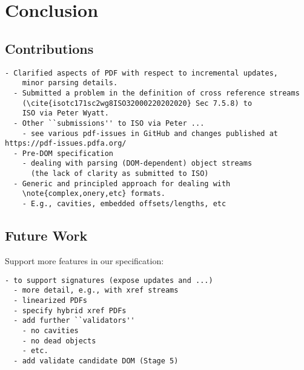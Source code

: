 \section{Conclusion }
\label{sec:conclusion}

\subsection{Contributions}

\begin{lstlisting}[style=meta]
  - Clarified aspects of PDF with respect to incremental updates,
    minor parsing details.
  - Submitted a problem in the definition of cross reference streams
    (\cite{isotc171sc2wg8ISO32000220202020} Sec 7.5.8) to
    ISO via Peter Wyatt.
  - Other ``submissions'' to ISO via Peter ...
    - see various pdf-issues in GitHub and changes published at https://pdf-issues.pdfa.org/
  - Pre-DOM specification
    - dealing with parsing (DOM-dependent) object streams
      (the lack of clarity as submitted to ISO)
  - Generic and principled approach for dealing with
    \note{complex,onery,etc} formats.
    - E.g., cavities, embedded offsets/lengths, etc
\end{lstlisting}

\subsection{Future Work}

Support more features in our specification:
\begin{lstlisting}[style=meta]
  - to support signatures (expose updates and ...)
  - more detail, e.g., with xref streams
  - linearized PDFs
  - specify hybrid xref PDFs
  - add further ``validators''
    - no cavities
    - no dead objects
    - etc.
  - add validate candidate DOM (Stage 5)
\end{lstlisting}

